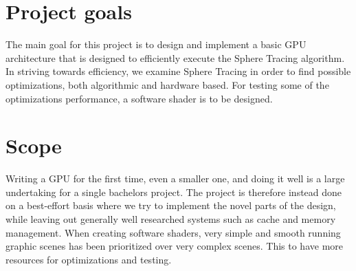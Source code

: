 	\section{Project goals}
	
		The main goal for this project is to design and implement a basic GPU
		architecture that is designed to efficiently execute the Sphere Tracing
		algorithm. In striving towards efficiency, we examine Sphere Tracing in
		order to find possible optimizations, both algorithmic and hardware 
		based. For testing some of the optimizations performance, a software 
		shader is to be designed.
		
	\section{Scope}


		Writing a GPU for the first time, even a smaller one, and doing it well
		is a large undertaking for a single bachelors project. The project is
		therefore instead done on a best-effort basis where we try to implement
		the novel parts of the design, while leaving out generally well
		researched systems such as cache and memory management. When creating 
                software shaders, very simple and smooth running graphic scenes has been 
                prioritized over very complex scenes. This to have more resources for 
                optimizations and testing.



